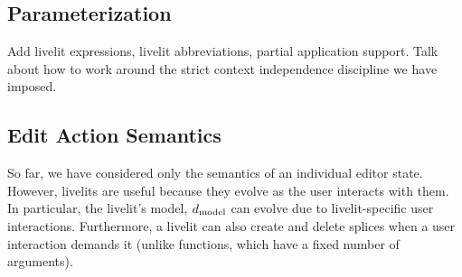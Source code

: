 \subsection{Parameterization}

Add livelit expressions, livelit abbreviations,
partial application support. Talk about how to work around the strict context
independence discipline we have imposed.

\subsection{Edit Action Semantics}
So far, we have considered only the semantics of an individual editor state.
However, livelits are useful because they evolve as the user interacts
with them. In particular, the livelit's model, $d_\text{model}$ can evolve
due to livelit-specific user interactions. Furthermore, a livelit can also
create and delete splices when a user interaction demands it (unlike functions, which have a fixed
number of arguments).

